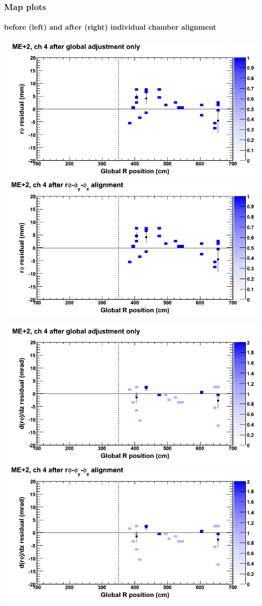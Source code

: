 \documentclass[compress]{beamer}
\begin{document}
\begin{frame}
\frametitle{Map plots}
\framesubtitle{before (left) and after (right) individual chamber alignment}
\includegraphics[width=0.5\linewidth]{ringmapplots_3dof/before_CSCvsr_mep2ch04_x.png} \includegraphics[width=0.5\linewidth]{ringmapplots_3dof/after_CSCvsr_mep2ch04_x.png}

\includegraphics[width=0.5\linewidth]{ringmapplots_3dof/before_CSCvsr_mep2ch04_dxdz.png} \includegraphics[width=0.5\linewidth]{ringmapplots_3dof/after_CSCvsr_mep2ch04_dxdz.png}
\end{frame}
\end{document}
